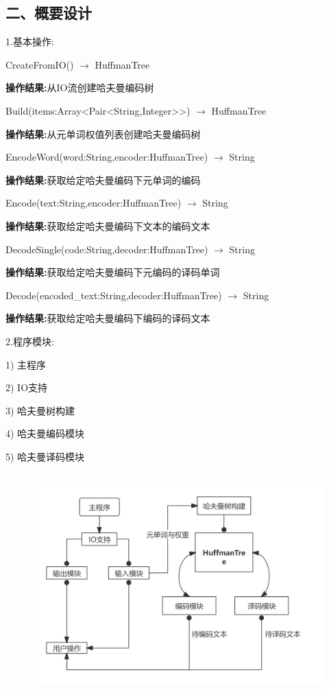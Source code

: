 \documentclass[UTF8, a4paper]{ctexart}
\begin{document}
\subsection*{二、概要设计}
\par
1.\;基本操作: \par
	CreateFromIO() $\rightarrow$ HuffmanTree \par
	\qquad\textbf{操作结果:}\;从IO流创建哈夫曼编码树 \par
	Build(items:Array<Pair<String,Integer>{>}) $\rightarrow$ HuffmanTree \par
	\qquad\textbf{操作结果:}\;从元单词权值列表创建哈夫曼编码树 \par
	EncodeWord(word:String,encoder:HuffmanTree) $\rightarrow$ String \par
	\qquad\textbf{操作结果:}\;获取给定哈夫曼编码下元单词的编码 \par
	Encode(text:String,encoder:HuffmanTree) $\rightarrow$ String \par
	\qquad\textbf{操作结果:}\;获取给定哈夫曼编码下文本的编码文本 \par
	DecodeSingle(code:String,decoder:HuffmanTree) $\rightarrow$ String \par
	\qquad\textbf{操作结果:}\;获取给定哈夫曼编码下元编码的译码单词 \par
	Decode(encoded\_text:String,decoder:HuffmanTree) $\rightarrow$ String \par
	\qquad\textbf{操作结果:}\;获取给定哈夫曼编码下编码的译码文本 \par
2.\;程序模块: \par
1) 主程序 \par
2) IO支持 \par
3) 哈夫曼树构建 \par
4) 哈夫曼编码模块 \par
5) 哈夫曼译码模块 \par
\begin{figure}[H]
	\begin{minipage}[t]{\linewidth}
		\centering
		\includegraphics[width=125mm,height=85mm]{./assets/DS07-1}
	\end{minipage}
\end{figure}
\end{document}
